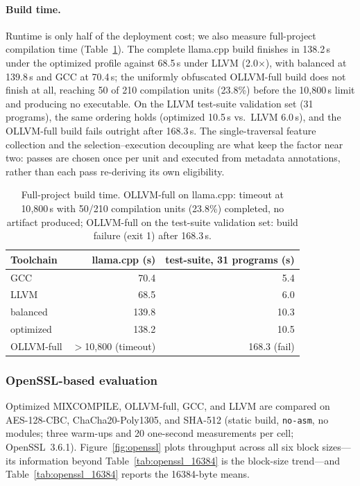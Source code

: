 \documentclass[5p,times,authoryear]{elsarticle}
\theoremstyle{plain}
\theoremstyle{definition}
\theoremstyle{remark}
\begin{document}
\paragraph{Build time.}
Runtime is only half of the deployment cost; we also measure
full-project compilation time (Table~\ref{tab:build_time}). The complete llama.cpp
build finishes in 138.2\,s under the optimized profile against 68.5\,s under LLVM
(2.0$\times$), with balanced at 139.8\,s and GCC at 70.4\,s; the uniformly obfuscated
OLLVM-full build does not finish at all, reaching 50 of 210 compilation units (23.8\%)
before the 10{,}800\,s limit and producing no executable. On the LLVM test-suite
validation set (31 programs), the same ordering holds (optimized 10.5\,s vs.\ LLVM
6.0\,s), and the OLLVM-full build fails outright after 168.3\,s. The single-traversal
feature collection and the selection--execution decoupling are what
keep the factor near two: passes are chosen once per unit and executed from metadata
annotations, rather than each pass re-deriving its own eligibility.

\begin{table}[!t]
\centering
\footnotesize
\caption{Full-project build time. OLLVM-full on llama.cpp: timeout at
10{,}800\,s with 50/210 compilation units (23.8\%) completed, no artifact produced;
OLLVM-full on the test-suite validation set: build failure (exit 1) after 168.3\,s.}
\label{tab:build_time}
\begin{tabular}{lrr}
\toprule
Toolchain & llama.cpp (s) & test-suite, 31 programs (s) \\
\midrule
GCC & 70.4 & 5.4 \\
LLVM & 68.5 & 6.0 \\
balanced & 139.8 & 10.3 \\
optimized & 138.2 & 10.5 \\
OLLVM-full & $>$10{,}800 (timeout) & 168.3 (fail) \\
\bottomrule
\end{tabular}
\end{table}

\subsubsection{OpenSSL-based evaluation}
Optimized MIXCOMPILE, OLLVM-full, GCC, and LLVM are compared on AES-128-CBC,
ChaCha20-Poly1305, and SHA-512 (static build, \texttt{no-asm}, no modules; three
warm-ups and 20 one-second measurements per cell; OpenSSL~3.6.1).
Figure~\ref{fig:openssl} plots throughput across all six block sizes---its
information beyond Table~\ref{tab:openssl_16384} is the block-size trend---and
Table~\ref{tab:openssl_16384} reports the 16384-byte means.
\end{document}

